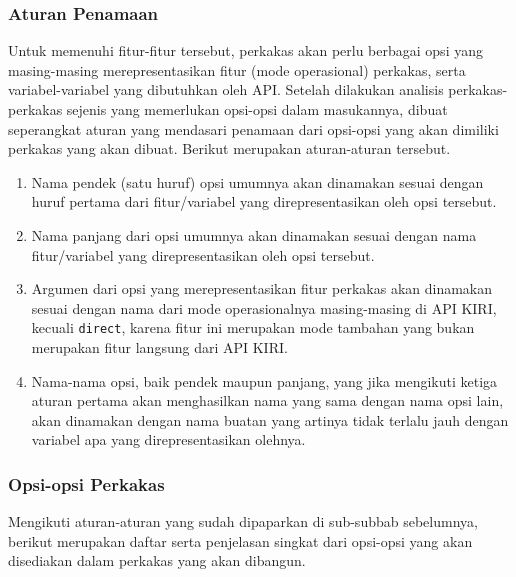 \subsubsection{Aturan Penamaan}
\label{sec:analysis-thesisapp-features-conventions}

Untuk memenuhi fitur-fitur tersebut, perkakas akan perlu berbagai opsi yang masing-masing merepresentasikan fitur (mode operasional) perkakas, serta variabel-variabel yang dibutuhkan oleh API. Setelah dilakukan analisis perkakas-perkakas sejenis yang memerlukan opsi-opsi dalam masukannya, dibuat seperangkat aturan yang mendasari penamaan dari opsi-opsi yang akan dimiliki perkakas yang akan dibuat. Berikut merupakan aturan-aturan tersebut.

\begin{enumerate}
	\item Nama pendek (satu huruf) opsi umumnya akan dinamakan sesuai dengan huruf pertama dari fitur/variabel yang direpresentasikan oleh opsi tersebut.
	\item Nama panjang dari opsi umumnya akan dinamakan sesuai dengan nama fitur/variabel yang direpresentasikan oleh opsi tersebut.
	\item Argumen dari opsi yang merepresentasikan fitur perkakas akan dinamakan sesuai dengan nama dari mode operasionalnya masing-masing di API KIRI, kecuali \texttt{direct}, karena fitur ini merupakan mode tambahan yang bukan merupakan fitur langsung dari API KIRI.
	\item Nama-nama opsi, baik pendek maupun panjang, yang jika mengikuti ketiga aturan pertama akan menghasilkan nama yang sama dengan nama opsi lain, akan dinamakan dengan nama buatan yang artinya tidak terlalu jauh dengan variabel apa yang direpresentasikan olehnya.
\end{enumerate}
\vspace{0.5em} %
\subsubsection{Opsi-opsi Perkakas}
\label{sec:analysis-thesisapp-features-options}

Mengikuti aturan-aturan yang sudah dipaparkan di sub-subbab sebelumnya, berikut merupakan daftar serta penjelasan singkat dari opsi-opsi yang akan disediakan dalam perkakas yang akan dibangun.

